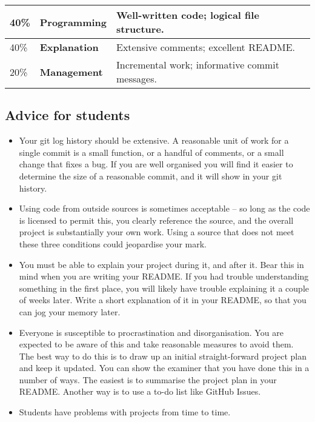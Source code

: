 \documentclass[12pt, a4paper]{article}
\begin{document}
\begin{center}
\begin{tabular}{lll}
\toprule
40\% & \textbf{Programming} & Well-written code; logical file structure.\\
\midrule
40\% & \textbf{Explanation} & Extensive comments; excellent README. \\
\midrule
20\% & \textbf{Management} & Incremental work; informative commit messages. \\
\bottomrule
\end{tabular}
\end{center}

\subsection*{Advice for students}
\begin{itemize}
    \item
    Your git log history should be extensive.
    A reasonable unit of work for a single commit is a small function, or a handful of comments, or a small change that fixes a bug.
    If you are well organised you will find it easier to determine the size of a reasonable commit, and it will show in your git history.
    \item
    Using code from outside sources is sometimes acceptable -- so long as the code is licensed to permit this, you clearly reference the source, and the overall project is substantially your own work.
    Using a source that does not meet these three conditions could jeopardise your mark.
    \item
    You must be able to explain your project during it, and after it.
    Bear this in mind when you are writing your README.
    If you had trouble understanding something in the first place, you will likely have trouble explaining it a couple of weeks later.
    Write a short explanation of it in your README, so that you can jog your memory later.
    \item
    Everyone is susceptible to procrastination and disorganisation.
    You are expected to be aware of this and take reasonable measures to avoid them.
    The best way to do this is to draw up an initial straight-forward project plan and keep it updated.
    You can show the examiner that you have done this in a number of ways.
    The easiest is to summarise the project plan in your README.
    Another way is to use a to-do list like GitHub Issues.
    \item
    Students have problems with projects from time to time.

\end{itemize}
\end{document}
